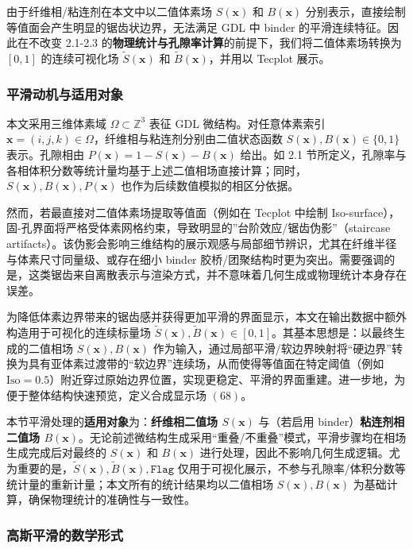 由于纤维相/粘连剂在本文中以二值体素场 $S(\textbf{x})$ 和 $B(\textbf{x})$ 分别表示，直接绘制等值面会产生明显的锯齿状边界，无法满足 GDL 中 binder 的平滑连续特征。因此在不改变 2.1-2.3 的\textbf{物理统计与孔隙率计算}的前提下，我们将二值体素场转换为 $[0,1]$ 的连续可视化场 $\tilde{S}(\textbf{x})$ 和 $\tilde{B}(\textbf{x})$，并用以 Tecplot 展示。

\subsubsection{\textbf{平滑动机与适用对象}}

本文采用三维体素域 $\Omega \subset \mathbb{Z}^3$ 表征 GDL 微结构。对任意体素索引 $\textbf{x} = (i,j,k) \in \Omega$，纤维相与粘连剂分别由二值状态函数 $S(\textbf{x}),B(\textbf{x}) \in \{0,1\}$ 表示。孔隙相由 $P(\textbf{x}) = 1 - S(\textbf{x}) - B(\textbf{x})$ 给出。如 2.1 节所定义，孔隙率与各相体积分数等统计量均基于上述二值相场直接计算；同时，$S(\textbf{x}),B(\textbf{x}),P(\textbf{x})$ 也作为后续数值模拟的相区分依据。

然而，若最直接对二值体素场提取等值面（例如在 Tecplot 中绘制 Iso-surface），固-孔界面将严格受体素网格约束，导致明显的”台阶效应/锯齿伪影”（staircase artifacts）。该伪影会影响三维结构的展示观感与局部细节辨识，尤其在纤维半径与体素尺寸同量级、或存在细小 binder 胶桥/团聚结构时更为突出。需要强调的是，这类锯齿来自离散表示与渲染方式，并不意味着几何生成或物理统计本身存在误差。

为降低体素边界带来的锯齿感并获得更加平滑的界面显示，本文在输出数据中额外构造用于可视化的连续标量场 $\tilde{S}(\textbf{x}), \tilde{B}(\textbf{x}) \in [0,1]$。其基本思想是：以最终生成的二值相场 $S(\textbf{x}), B(\textbf{x})$ 作为输入，通过局部平滑/软边界映射将“硬边界”转换为具有亚体素过渡带的“软边界”连续场，从而使得等值面在特定阈值（例如 $\mathrm{Iso}=0.5$）附近穿过原始边界位置，实现更稳定、平滑的界面重建。进一步地，为便于整体结构快速预览，定义合成显示场 $(68)$。

本节平滑处理的\textbf{适用对象}为：\textbf{纤维相二值场 $S(\textbf{x})$} 与（若启用 binder）\textbf{粘连剂相二值场 $B(\textbf{x})$}。无论前述微结构生成采用“重叠/不重叠”模式，平滑步骤均在相场生成完成后对最终的 $S(\textbf{x})$ 和 $B(\textbf{x})$ 进行处理，因此不影响几何生成逻辑。尤为重要的是，$\tilde{S}(\textbf{x}),\tilde{B}(\textbf{x}),\texttt{Flag}$ 仅用于可视化展示，不参与孔隙率/体积分数等统计量的重新计量；本文所有的统计结果均以二值相场 $S(\textbf{x}), B(\textbf{x})$ 为基础计算，确保物理统计的准确性与一致性。

\subsubsection{\textbf{高斯平滑的数学形式}}

